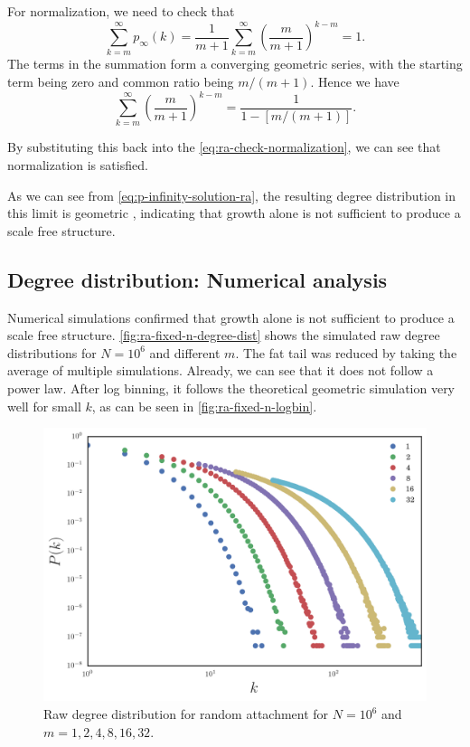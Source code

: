 For normalization, we need to check that 
\begin{equation}
	\sum_{k=m}^{\infty}p_{\infty}(k) = \frac{1}{m+1} \sum_{k=m}^{\infty} \left ( \frac{m}{m+1}\right )^{k-m} = 1.
	\label{eq:ra-check-normalization}
\end{equation}
The terms in the summation form a converging geometric series, with the starting term being zero and common ratio being $m / (m+1)$. Hence we have 
\begin{equation}
	\sum_{k=m}^{\infty} \left ( \frac{m}{m+1} \right )^{k-m} = \frac{1}{1 - [m / (m+1)]}. 
	\label{eq:ra-geom-series}
\end{equation}

By substituting this back into the \autoref{eq:ra-check-normalization}, we can see that normalization is satisfied. 

As we can see from \autoref{eq:p-infinity-solution-ra}, the resulting degree distribution in this limit is geometric \citep{Pekoz2013}, indicating that growth alone is not sufficient to produce a scale free structure. 

\subsection{Degree distribution: Numerical analysis}\label{subsection:ra-numerical-analysis}
Numerical simulations confirmed that growth alone is not sufficient to produce a scale free structure. \autoref{fig:ra-fixed-n-degree-dist} shows the simulated raw degree distributions for $N=10^6$ and different $m$. The fat tail was reduced by taking the average of multiple simulations. Already, we can see that it does not follow a power law. After log binning, it follows the theoretical geometric simulation very well for small $k$, as can be seen in \autoref{fig:ra-fixed-n-logbin}.

\begin{figure}
    \centering
    \includegraphics[height=0.5\linewidth]{img/ra-fixed-n-degree-dist}
    \caption{Raw degree distribution for random attachment for $N = 10^6$ and $m = 1, 2, 4, 8, 16, 32$. }
    \label{fig:ra-fixed-n-degree-dist}
\end{figure}

